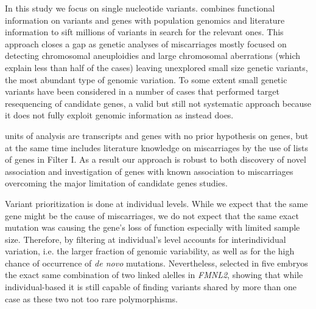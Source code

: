 In this study we focus on single nucleotide variants. \gp combines functional information on variants and genes with population genomics and literature information to sift millions of variants in search for the relevant ones. This approach closes a gap as genetic analyses of miscarriages mostly focused on detecting chromosomal aneuploidies and large chromosomal aberrations (which explain less than half of the cases) leaving unexplored small size genetic variants, the most abundant type of genomic variation. To some extent small genetic variants have been considered in a number of cases that performed target resequencing of candidate genes, a valid but still not systematic approach because it does not fully exploit genomic information as instead \gp does.

\gp units of analysis are transcripts and genes with no prior hypothesis on genes, but at the same time \gp includes literature knowledge on miscarriages by the use of lists of genes in Filter I. As a result our approach is robust to both discovery of novel association and investigation of genes with known association to miscarriages overcoming the major limitation of candidate genes studies. 

Variant prioritization is done at individual levels. While we expect that the same gene might be the cause of miscarriages, we do not expect that the same exact mutation was causing the gene's loss of function especially with limited sample size. Therefore, by filtering at individual's level \gp accounts for interindividual variation, i.e. the larger fraction of genomic variability, as well as for the high chance of occurrence of \textit{de novo} mutations. Nevertheless, \gp selected in five embryos the exact same combination of two linked alelles in \textit{FMNL2}, showing that while individual-based it is still capable of finding variants shared by more than one case as these two not too rare polymorphisms. 


